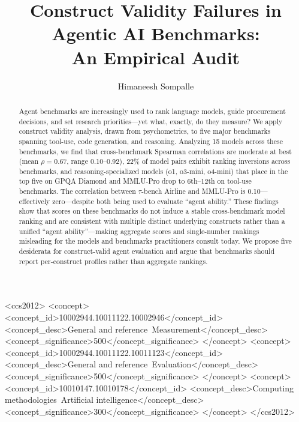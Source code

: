 \documentclass[sigconf]{acmart}
\begin{document}
\title{Construct Validity Failures in Agentic AI Benchmarks:\\An Empirical Audit}

\author{Himaneesh Sompalle}

\begin{abstract}
Agent benchmarks are increasingly used to rank language models, guide procurement decisions, and set research priorities---yet what, exactly, do they measure? We apply construct validity analysis, drawn from psychometrics, to five major benchmarks spanning tool-use, code generation, and reasoning. Analyzing 15 models across these benchmarks, we find that cross-benchmark Spearman correlations are moderate at best (mean $\rho = 0.67$, range 0.10--0.92), 22\% of model pairs exhibit ranking inversions across benchmarks, and reasoning-specialized models (o1, o3-mini, o4-mini) that place in the top five on GPQA Diamond and MMLU-Pro drop to 6th--12th on tool-use benchmarks. The correlation between $\tau$-bench Airline and MMLU-Pro is 0.10---effectively zero---despite both being used to evaluate ``agent ability.'' These findings show that scores on these benchmarks do not induce a stable cross-benchmark model ranking and are consistent with multiple distinct underlying constructs rather than a unified ``agent ability''---making aggregate scores and single-number rankings misleading for the models and benchmarks practitioners consult today. We propose five desiderata for construct-valid agent evaluation and argue that benchmarks should report per-construct profiles rather than aggregate rankings.
\end{abstract}

\begin{CCSXML}
<ccs2012>
<concept>
<concept_id>10002944.10011122.10002946</concept_id>
<concept_desc>General and reference~Measurement</concept_desc>
<concept_significance>500</concept_significance>
</concept>
<concept>
<concept_id>10002944.10011122.10011123</concept_id>
<concept_desc>General and reference~Evaluation</concept_desc>
<concept_significance>500</concept_significance>
</concept>
<concept>
<concept_id>10010147.10010178</concept_id>
<concept_desc>Computing methodologies~Artificial intelligence</concept_desc>
<concept_significance>300</concept_significance>
</concept>
</ccs2012>
\end{CCSXML}
\end{document}
